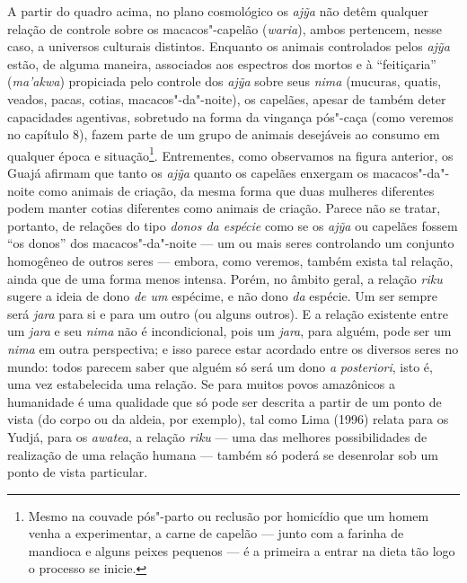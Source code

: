 A partir do quadro acima, no plano cosmológico os \emph{ajỹa} não detêm
qualquer relação de controle sobre os macacos"-capelão (\emph{waria}),
ambos pertencem, nesse caso, a universos culturais distintos. Enquanto
os animais controlados pelos \emph{ajỹa} estão, de alguma maneira,
associados aos espectros dos mortos e à ``feitiçaria'' (\emph{ma'akwa})
propiciada pelo controle dos \emph{ajỹa} sobre seus \emph{nima}
(mucuras, quatis, veados, pacas, cotias, macacos"-da"-noite), os capelães,
apesar de também deter capacidades agentivas, sobretudo na forma da
vingança pós"-caça (como veremos no capítulo 8), fazem parte de um grupo
de animais desejáveis ao consumo em qualquer época e situação\footnote{Mesmo
  na couvade pós"-parto ou reclusão por homicídio que um homem venha a
  experimentar, a carne de capelão --- junto com a farinha de mandioca e
  alguns peixes pequenos --- é a primeira a entrar na dieta tão logo o
  processo se inicie.}. Entrementes, como observamos na figura anterior,
os Guajá afirmam que tanto os \emph{ajỹa} quanto os capelães enxergam os
macacos"-da"-noite como animais de criação, da mesma forma que duas
mulheres diferentes podem manter cotias diferentes como animais de
criação. Parece não se tratar, portanto, de relações do tipo \emph{donos
da espécie} como se os \emph{ajỹa} ou capelães fossem ``os donos'' dos
macacos"-da"-noite --- um ou mais seres controlando um conjunto homogêneo de
outros seres --- embora, como veremos, também exista tal relação, ainda
que de uma forma menos intensa. Porém, no âmbito geral, a relação
\emph{riku} sugere a ideia de dono \emph{de um} espécime, e não dono
\emph{da} espécie. Um ser sempre será \emph{jara} para si e para um
outro (ou alguns outros). E a relação existente entre um \emph{jara} e
seu \emph{nima} não é incondicional, pois um \emph{jara}, para alguém,
pode ser um \emph{nima} em outra perspectiva; e isso parece estar
acordado entre os diversos seres no mundo: todos parecem saber que
alguém só será um dono \emph{a} \emph{posteriori}, isto é, uma vez
estabelecida uma relação. Se para muitos povos amazônicos a humanidade é
uma qualidade que só pode ser descrita a partir de um ponto de vista (do
corpo ou da aldeia, por exemplo), tal como Lima (1996) relata para os
Yudjá, para os \emph{awatea}, a relação \emph{riku} --- uma das melhores
possibilidades de realização de uma relação humana --- também só poderá se
desenrolar sob um ponto de vista particular.

